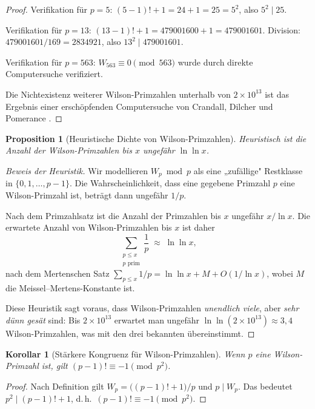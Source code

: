 \documentclass[12pt,a4paper]{amsart}
\newtheorem{korollar}[theorem]{Korollar}
\newtheorem{proposition}[theorem]{Proposition}
\theoremstyle{definition}
\begin{document}
\begin{proof}
  Verifikation für $p = 5$:
  $(5-1)! + 1 = 24 + 1 = 25 = 5^2$, also $5^2 \mid 25$. \checkmark

  Verifikation für $p = 13$:
  $(13-1)! + 1 = 479001600 + 1 = 479001601$. Division: $479001601 / 169 = 2834921$,
  also $13^2 \mid 479001601$. \checkmark

  Verifikation für $p = 563$:
  $W_{563} \equiv 0 \pmod{563}$ wurde durch direkte Computersuche verifiziert.

  Die Nichtexistenz weiterer Wilson-Primzahlen unterhalb von $2 \times 10^{13}$
  ist das Ergebnis einer erschöpfenden Computersuche von Crandall, Dilcher
  und Pomerance \cite{Crandall1997}.
\end{proof}

\begin{proposition}[Heuristische Dichte von Wilson-Primzahlen]\label{prop:heuristik}
  Heuristisch ist die Anzahl der Wilson-Primzahlen bis $x$ ungefähr $\ln \ln x$.
\end{proposition}

\begin{proof}[Beweis der Heuristik]
  Wir modellieren $W_p \bmod p$ als eine „zufällige" Restklasse in
  $\{0, 1, \ldots, p-1\}$. Die Wahrscheinlichkeit, dass eine gegebene
  Primzahl $p$ eine Wilson-Primzahl ist, beträgt dann ungefähr $1/p$.

  Nach dem Primzahlsatz ist die Anzahl der Primzahlen bis $x$ ungefähr
  $x/\ln x$. Die erwartete Anzahl von Wilson-Primzahlen bis $x$ ist daher
  \[
    \sum_{\substack{p \leq x \\ p \text{ prim}}} \frac{1}{p}
    \;\approx\; \ln \ln x,
  \]
  nach dem Mertenschen Satz $\sum_{p \leq x} 1/p = \ln \ln x + M + O(1/\ln x)$,
  wobei $M$ die Meissel--Mertens-Konstante ist.

  Diese Heuristik sagt voraus, dass Wilson-Primzahlen \emph{unendlich viele},
  aber \emph{sehr dünn gesät} sind: Bis $2 \times 10^{13}$ erwartet man
  ungefähr $\ln\ln(2 \times 10^{13}) \approx 3{,}4$ Wilson-Primzahlen,
  was mit den drei bekannten übereinstimmt.
\end{proof}

\begin{korollar}[Stärkere Kongruenz für Wilson-Primzahlen]\label{kor:staerker}
  Wenn $p$ eine Wilson-Primzahl ist, gilt $(p-1)! \equiv -1 \pmod{p^2}$.
\end{korollar}

\begin{proof}
  Nach Definition gilt $W_p = \bigl((p-1)!+1\bigr)/p$ und $p \mid W_p$.
  Das bedeutet $p^2 \mid (p-1)!+1$, d.\,h.\ $(p-1)! \equiv -1 \pmod{p^2}$.
\end{proof}
\end{document}
